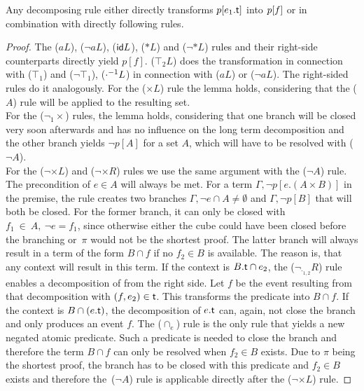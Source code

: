 \documentclass[a4paper,twoside,12pt, english]{article}
\begin{document}
\begin{lemma}
Any decomposing rule either directly transforms $p[e_1. \textsf{\upshape t}]$ into $p[f]$ or in combination with directly following rules.
\end{lemma}
\begin{proof}
The ($aL$), ($\neg aL$), ($\textsf{\upshape id} L$), ($*L$) and ($\neg *L$) rules and their right-side counterparts directly yield $p[f]$.
($\top_2 L$) does the transformation in connection with ($\top_1$) and ($\neg \top_1$), ($\cdot^{{-1}} L$) in connection with ($aL$) or ($\neg aL$). The right-sided rules do it analogously.
For the (${\times}L$) rule the lemma holds, considering that the ($A$) rule will be applied to the resulting set. \\

For the ($\neg_1 {\times}$) rules, the lemma holds, considering that one branch will be closed very soon afterwards and has no influence on the long term decomposition and the other branch yields $\neg p[A]$ for a set $A$, which will have to be resolved with ($\neg A$).\\

For the ($\neg {\times}L$) and ($\neg {\times}R$) rules we use the same argument with the ($\neg A$) rule. The precondition of $e \in A$ will always be met. 
For a term $\Gamma, \neg p[e.(A \times B)]$ in the premise, the rule creates two branches $\Gamma, \neg e \cap A \neq \emptyset$ and $\Gamma, \neg p[B]$ that will both be closed.
For the former branch, it can only be closed with~$f_1~\in~A,~\neg e = f_1$, since otherwise either the cube could have been closed before the branching or~$\pi$ would not be the shortest proof.
The latter branch will always result in a term of the form $B \cap f$ if no $f_2 \in B$ is available. The reason is, that any context will result in this term. If the context is $B.\textsf{\upshape t} \cap e_2$, the ($\neg_{\cdot_{1,2}}R$) rule enables a decomposition of \relt{} from the right side. Let $f$ be the event resulting from that decomposition with $(f,e_2) \in \textsf{\upshape t}$. This transforms the predicate into $B \cap f$.
If the context is $B \cap (e.\textsf{\upshape t})$, the decomposition of $e.\textsf{\upshape t}$ can, again, not close the branch and only produces an event $f$.
The ($\cap_e$) rule is the only rule that yields a new negated atomic predicate. Such a predicate is needed to close the branch and therefore the term $B \cap f$ can only be resolved when $f_2 \in B$ exists. Due to $\pi$ being the shortest proof, the branch has to be closed with this predicate and $f_2 \in B$ exists and therefore the~($\neg A$) rule is applicable directly after the ($\neg {\times}L$) rule. 


\end{proof}
\end{document}

